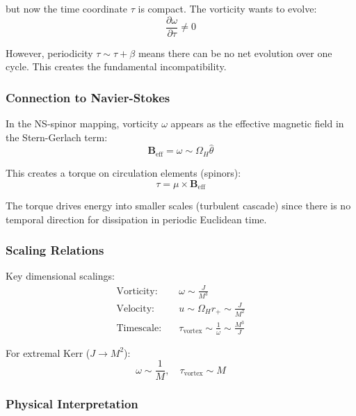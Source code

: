 \documentclass[11pt]{article}
\begin{document}
but now the time coordinate $\tau$ is compact. The vorticity wants to evolve:
\begin{equation}
\frac{\partial \omega}{\partial \tau} \neq 0
\end{equation}

However, periodicity $\tau \sim \tau + \beta$ means there can be no net evolution over one cycle. This creates the fundamental incompatibility.

\subsubsection{Connection to Navier-Stokes}

In the NS-spinor mapping, vorticity $\omega$ appears as the effective magnetic field in the Stern-Gerlach term:
\begin{equation}
\mathbf{B}_{\text{eff}} = \omega \sim \Omega_H \hat{\theta}
\end{equation}

This creates a torque on circulation elements (spinors):
\begin{equation}
\tau = \mu \times \mathbf{B}_{\text{eff}}
\end{equation}

The torque drives energy into smaller scales (turbulent cascade) since there is no temporal direction for dissipation in periodic Euclidean time.

\subsubsection{Scaling Relations}

Key dimensional scalings:
\begin{align}
\text{Vorticity:} \quad &\omega \sim \frac{J}{M^3} \\
\text{Velocity:} \quad &u \sim \Omega_H r_+ \sim \frac{J}{M^2} \\
\text{Timescale:} \quad &\tau_{\text{vortex}} \sim \frac{1}{\omega} \sim \frac{M^3}{J}
\end{align}

For extremal Kerr ($J \to M^2$):
\begin{equation}
\omega \sim \frac{1}{M}, \quad \tau_{\text{vortex}} \sim M
\end{equation}

\subsubsection{Physical Interpretation}
\end{document}
